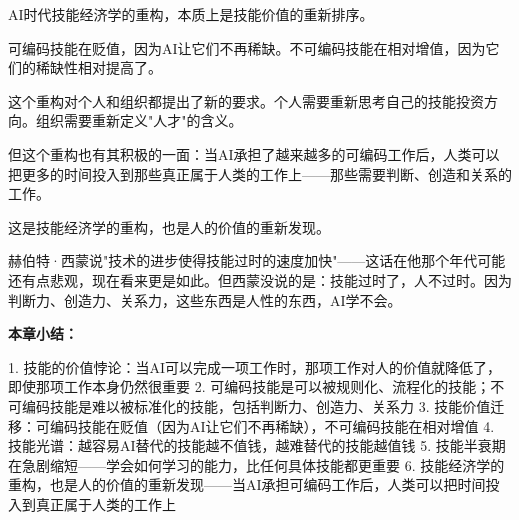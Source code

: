 AI时代技能经济学的重构，本质上是技能价值的重新排序。

可编码技能在贬值，因为AI让它们不再稀缺。不可编码技能在相对增值，因为它们的稀缺性相对提高了。

这个重构对个人和组织都提出了新的要求。个人需要重新思考自己的技能投资方向。组织需要重新定义"人才"的含义。

但这个重构也有其积极的一面：当AI承担了越来越多的可编码工作后，人类可以把更多的时间投入到那些真正属于人类的工作上——那些需要判断、创造和关系的工作。

这是技能经济学的重构，也是人的价值的重新发现。

赫伯特·西蒙说"技术的进步使得技能过时的速度加快"——这话在他那个年代可能还有点悲观，现在看来更是如此。但西蒙没说的是：技能过时了，人不过时。因为判断力、创造力、关系力，这些东西是人性的东西，AI学不会。


\textbf{本章小结：}

1. 技能的价值悖论：当AI可以完成一项工作时，那项工作对人的价值就降低了，即使那项工作本身仍然很重要
2. 可编码技能是可以被规则化、流程化的技能；不可编码技能是难以被标准化的技能，包括判断力、创造力、关系力
3. 技能价值迁移：可编码技能在贬值（因为AI让它们不再稀缺），不可编码技能在相对增值
4. 技能光谱：越容易AI替代的技能越不值钱，越难替代的技能越值钱
5. 技能半衰期在急剧缩短——学会如何学习的能力，比任何具体技能都更重要
6. 技能经济学的重构，也是人的价值的重新发现——当AI承担可编码工作后，人类可以把时间投入到真正属于人类的工作上
